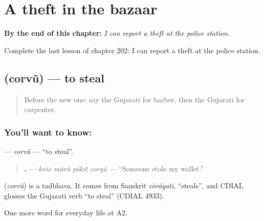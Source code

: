 
\chapter{A theft in the bazaar}
\label{ch:gu-a-theft-in-the-bazaar}

\begin{chapteropening}
\textbf{By the end of this chapter:} \emph{I can report a theft at the police station.}

Complete the last lesson of chapter 202: I can report a theft at the police station.
\end{chapteropening}

\section[\texorpdfstring{\gu{ચોરવું} (corvũ)}{ચોરવું (corvũ)}]{ (corvũ) — to steal}

\label{lesson:GU-C202-corvu}



\begin{quote}
Before the new one: say the Gujarati for barber, then the Gujarati for carpenter.
\end{quote}

\subsection*{You'll want to know: }
\textbf{} — \emph{corvũ} — \textquotedblleft{}to steal\textquotedblright{}.

\begin{quote}
\textbf{   .} — \emph{koīe mārũ pākīṭ coryũ} — \textquotedblleft{}Someone stole my wallet.\textquotedblright{}
\end{quote}

\begin{cousinweb}
\textbf{} (\emph{corvũ}) is a tadbhava. It comes from Sanskrit \emph{cōráyati}, \textquotedblleft{}steals\textquotedblright{}, and CDIAL glosses the Gujarati verb \textquotedblleft{}to steal\textquotedblright{} (CDIAL 4933).
\end{cousinweb}

\begin{grammarlens}[title={What you've built}]
One more word for everyday life at A2.
\end{grammarlens}

